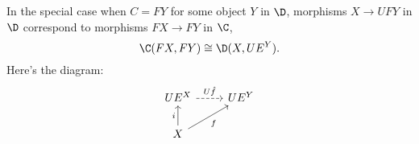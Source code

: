 In the special case when $C=FY$ for some object $Y$ in $\D$, morphisms $X\to UFY$ in $\D$ correspond to morphisms $FX\to FY$ in $\C$,
\begin{equation}\label{eq:bij1}
\C(FX,FY)\cong \D(X,UE^Y).
\end{equation}
Here's the diagram:
\[
  \begin{tikzcd}
  UE^X \arrow[r, dashed, "U\hat f"]       & UE^Y \\
  X \arrow[ru, "f"'] \arrow[u, "i"] &   
  \end{tikzcd}
\]


